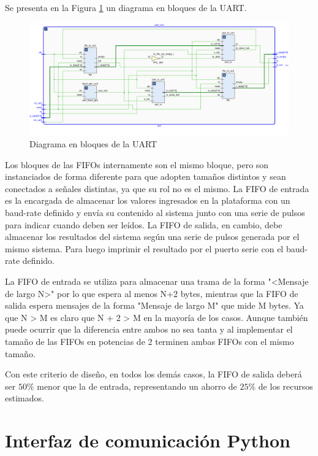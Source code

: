 		Se presenta en la Figura \ref{fig:FSMD_UART} un diagrama en bloques de la UART.
			
		\begin{figure}[h]
		\centering
		\includegraphics[scale=.35]{./Figures/UART}
			\caption{Diagrama en bloques de la UART}
			\label{fig:FSMD_UART}
		\end{figure}

		Los bloques de las FIFOs internamente son el mismo bloque, pero son instanciados de forma diferente para que adopten tamaños distintos y sean conectados a señales distintas, ya que su rol no es el mismo. La FIFO de entrada es la encargada de almacenar los valores ingresados en la plataforma con un baud-rate definido y envía su contenido al sistema junto con una serie de pulsos para indicar cuando deben ser leídos. La FIFO de salida, en cambio, debe almacenar los resultados del sistema según una serie de pulsos generada por el mismo sistema. Para luego imprimir el resultado por el puerto serie con el baud-rate definido.

		La FIFO de entrada se utiliza para almacenar una trama de la forma "<Mensaje de largo N>" por lo que espera al menos N+2 bytes, mientras que la FIFO de salida espera mensajes de la forma "Mensaje de largo M" que mide M bytes. Ya que N > M es claro que N + 2 > M en la mayoría de los casos. Aunque también puede ocurrir que la diferencia entre ambos no sea tanta y al implementar el tamaño de las FIFOs en potencias de 2 terminen ambas FIFOs con el mismo tamaño. 

		Con este criterio de diseño, en todos los demás casos, la FIFO de salida deberá ser $50\%$ menor que la de entrada, representando un ahorro de $25\%$ de los recursos estimados.
		
\section{Interfaz de comunicación Python}

